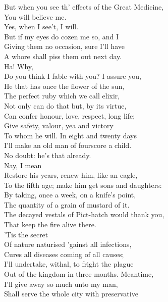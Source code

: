 \documentclass[a4paper,oneside,12pt]{memoir}
\begin{document}
\begin{drama*}
\mammonspeaks {} But when you see th' effects of the Great Medicine,\\
You will believe me.\\
\surlyspeaks {} Yes, when I see't, I will.\\
But if my eyes do cozen me so, and I\\
Giving them no occasion, sure I'll have\\
A whore shall piss them out next day.\\
\mammonspeaks {} Ha! Why,\\
Do you think I fable with you? I assure you,\\
He that has once the flower of the sun,\\
The perfect ruby which we call elixir,\\
Not only can do that but, by its virtue,\\
Can confer honour, love, respect, long life;\\
Give safety, valour, yea and victory\\
To whom he will. In eight and twenty days\\
I'll make an old man of fourscore a child.\\
\surlyspeaks No doubt: he's that already.\\
\mammonspeaks {} Nay, I mean\\
Restore his years, renew him, like an eagle,\\
To the fifth age; make him get sons and daughters:\\
By taking, once a week, on a knife's point,\\
The quantity of a grain of mustard of it.\\
\surlyspeaks The decayed vestals of Pict-hatch would thank you,\\
That keep the fire alive there.\\
\mammonspeaks {} 'Tis the secret\\
Of nature naturised 'gainst all infections,\\
Cures all diseases coming of all causes;\\
I'll undertake, withal, to fright the plague\\
Out of the kingdom in three months. Meantime,\\
I'll give away so much unto my man,\\
Shall serve the whole city with preservative\\

\end{drama*}
\end{document}
